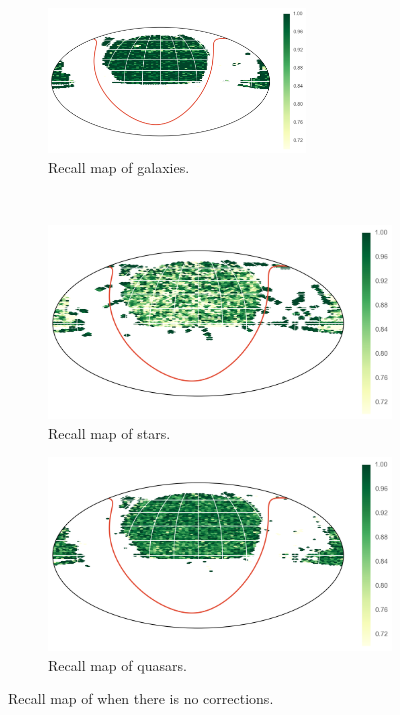 \begin{figure}[p]
	\centering
	\begin{subfigure}{\textwidth}
		\centering
		\includegraphics[width=0.75\textwidth]{figures/appendix/map_recall_uncorrected_Galaxy}
		\caption{Recall map of galaxies.}
		\label{fig:map_recall_uncorrected_galaxies}
	\end{subfigure}\\
	\begin{subfigure}{\textwidth}
		\centering
		\includegraphics[width=0.75\linewidth]{figures/appendix/map_recall_uncorrected_Star}
		\caption{Recall map of stars.}
		\label{fig:map_recall_uncorrected_stars}
	\end{subfigure}
	\begin{subfigure}{\textwidth}
		\centering
		\includegraphics[width=0.75\linewidth]{figures/appendix/map_recall_uncorrected_Quasar}
		\caption{Recall map of quasars.}
		\label{fig:map_recall_uncorrected_quasars}
	\end{subfigure}
	\caption{Recall map of when there is no corrections.}
	\label{fig:map_recall_uncorrected}
\end{figure}


